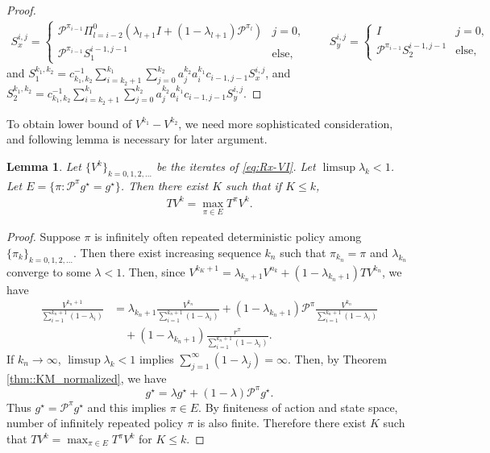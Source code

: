 \documentclass{article} %
\newcommand{\cP}{\mathcal{P}}
\newtheorem{lemma}{Lemma}
\begin{document}
\begin{proof}
    \begin{align*}
     S^{i,j}_{x}=\left\{
    \begin{array}{ll}
    \cP^{\pi_{i-1}}\Pi^{0}_{l=i-2}(\lambda_{l+1}I+(1-\lambda_{l+1}) \cP^{\pi_l}) & j=0,\\
    \cP^{\pi_{i-1}}S^{i-1,j-1}_{1} & \text{else},
    \end{array}\right. \qquad      S^{i,j}_{y}=\left\{
    \begin{array}{ll}
    I & j=0,\\
    \cP^{\pi_{i-1}}S^{i-1,j-1}_{2} & \text{else},
    \end{array}\right. 
    \end{align*}
and $S^{k_1,k_2}_1 =c_{k_1,k_2}^{-1}\sum^{k_1}_{i=k_2+1} \sum^{k_2}_{j=0} a^{k_2}_j  a^{k_1}_i c_{i-1,j-1}S^{i,j}_{x}$, and $S^{k_1,k_2}_2 =c_{k_1,k_2}^{-1}\sum^{k_1}_{i=k_2+1} \sum^{k_2}_{j=0} a^{k_2}_j  a^{k_1}_i c_{i-1,j-1}S^{i,j}_{y}$.

\end{proof}
To obtain lower bound of $V^{k_1}-V^{k_2}$, we need more sophisticated consideration, and following lemma is necessary for later argument.
\begin{lemma}\label{lem::opt_policy_cond}
Let $\{V^k\}_{k=0, 1,2,\dots}$ be the iterates of \ref{eq:Rx-VI}. Let $\limsup \lambda_k <1  $.  Let $E = \{\pi: \cP^{\pi}g^{\star}= g^{\star}\}$. Then there exist $K$  such that if $K \le k$,
    \begin{align*}
        TV^k=\max_{\pi \in E}T^{\pi}V^k. 
    \end{align*}
\end{lemma}
\begin{proof}
 Suppose $\pi$ is infinitely often repeated deterministic policy among $\{\pi_k\}_{k=0, 1,2,\dots}$. Then there exist increasing sequence $k_n$ such that $\pi_{k_n}=\pi$ and $\lambda_{k_n}$ converge to some $\lambda <1$. Then, since $  V^{k_K+1} = \lambda_{k_n+1}V^{n_k}+(1-\lambda_{k_n+1})TV^{k_n}$, we have
   \begin{align*}
        \frac{V^{k_n+1}}{\sum_{i=1}^{k_n+1} (1-\lambda_i)} &= \lambda_{k_n+1}\frac{V^{k_n}}{\sum_{i=1}^{k_n+1} (1-\lambda_i)}+(1-\lambda_{k_n+1})\cP^{\pi}\frac{V^{k_n}}{\sum_{i=1}^{k_n+1} (1-\lambda_i)} 
        \\& \quad + (1-\lambda_{k_n+1})\frac{r^{\pi}}{{\sum_{i=1}^{k_n+1} (1-\lambda_i)}}.
    \end{align*}
  If $k_n \rightarrow \infty$,  $\limsup \lambda_k <1$ implies $\sum^{\infty}_{j=1} (1-\lambda_{j}) = \infty$. Then, by Theorem \ref{thm::KM_normalized}, we have 
  \[g^{\star} = \lambda g^{\star}+(1-\lambda)\cP^{\pi}g^{\star}.\]
  Thus $g^{\star} = \cP^{\pi}g^{\star}$ and this implies $\pi \in E$. By finiteness of action and state space, number of infinitely repeated policy $\pi$ is also finite. Therefore there exist $K$ such that $TV^k=\max_{\pi \in E}T^{\pi}V^k$ for $K \le k$.
\end{proof}
\end{document}
